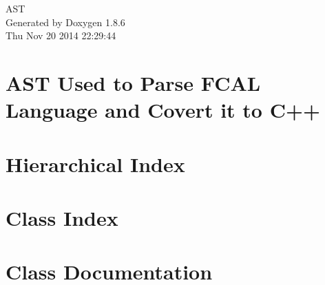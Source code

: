 \documentclass[twoside]{book}
\newcommand{\clearemptydoublepage}{%
  \newpage{\pagestyle{empty}\cleardoublepage}%
}
\begin{document}
\hypersetup{pageanchor=false}
\begin{titlepage}
\vspace*{7cm}
\begin{center}%
{\Large A\-S\-T }\\
\vspace*{1cm}
{\large Generated by Doxygen 1.8.6}\\
\vspace*{0.5cm}
{\small Thu Nov 20 2014 22:29:44}\\
\end{center}
\end{titlepage}
\clearemptydoublepage
\tableofcontents
\clearemptydoublepage
{}
\hypersetup{pageanchor=true}

\chapter{A\-S\-T Used to Parse F\-C\-A\-L Language and Covert it to C++}
\label{index}\hypertarget{index}{}
\chapter{Hierarchical Index}

\chapter{Class Index}

\chapter{Class Documentation}



























































\newpage
{}
{}
\printindex
\end{document}
